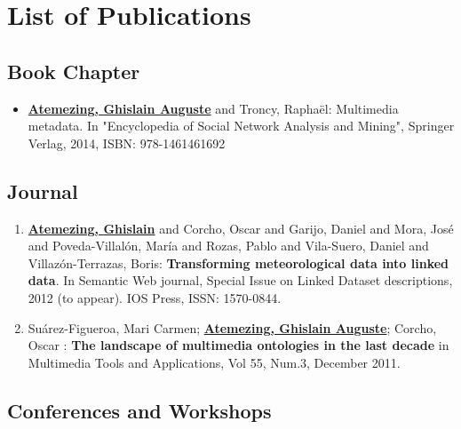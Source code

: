 

\chapter*{List of Publications}

\section*{Book Chapter}
\label{sec:book}
\begin{itemize}
\item \underline{\textbf{{A}temezing, {G}hislain {A}uguste}} and  {T}roncy, {R}apha{\"e}l: {M}ultimedia metadata. {I}n "{E}ncyclopedia of {S}ocial {N}etwork {A}nalysis and {M}ining", {S}pringer {V}erlag, 2014, {ISBN}: 978-1461461692 
\end{itemize}

\section*{Journal}
\label{sec:journal}
\begin{enumerate}

\item \underline{\textbf{{A}temezing, {G}hislain}} and  {C}orcho, {O}scar and  {G}arijo, {D}aniel and  {M}ora, {J}os{\'e} and  {P}oveda-{V}illal{\'o}n, {M}ar{\'i}a and  {R}ozas, {P}ablo and  {V}ila-{S}uero, {D}aniel and  {V}illaz{\'o}n-{T}errazas, {B}oris: \textbf{{T}ransforming meteorological data into linked data}. In {S}emantic {W}eb journal, {S}pecial {I}ssue on {L}inked {D}ataset descriptions, 2012 (to appear). {IOS} {P}ress, {ISSN}: 1570-0844.

\item Su\'{a}rez-Figueroa, Mari Carmen; \underline{\textbf{Atemezing, Ghislain Auguste}}; Corcho, Oscar : \textbf{The landscape of 
multimedia ontologies in the last decade} in  Multimedia Tools and Applications, Vol 55, Num.3, December 2011.

\end{enumerate}

\section*{Conferences and Workshops}\label{sec:conf}

